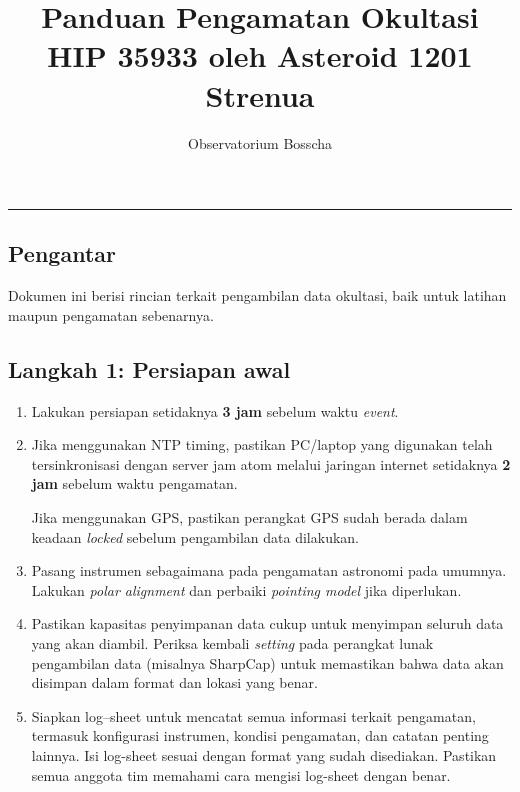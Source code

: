 \documentclass[12pt,a4paper]{article}
\title{\textbf{Panduan Pengamatan Okultasi HIP 35933 oleh Asteroid 1201 Strenua}}
\author{Observatorium Bosscha}
\begin{document}
\maketitle
\noindent\rule{\linewidth}{0.4pt}

\subsection*{Pengantar}
Dokumen ini berisi rincian terkait pengambilan data okultasi, baik untuk latihan maupun pengamatan sebenarnya.
\subsection*{Langkah 1: Persiapan awal}
\begin{enumerate}
	\item Lakukan persiapan setidaknya \textbf{3 jam} sebelum waktu \textit{event}.
	\item Jika menggunakan NTP timing, pastikan PC/laptop yang digunakan telah tersinkronisasi dengan server jam atom melalui jaringan internet setidaknya \textbf{2 jam} sebelum waktu pengamatan.
	
	Jika menggunakan GPS, pastikan perangkat GPS sudah berada dalam keadaan \textit{locked} sebelum pengambilan data dilakukan.
	\item Pasang instrumen sebagaimana pada pengamatan astronomi pada umumnya. Lakukan \textit{polar alignment} dan perbaiki \textit{pointing model} jika diperlukan.
	\item Pastikan kapasitas penyimpanan data cukup untuk menyimpan seluruh data yang akan diambil. Periksa kembali \textit{setting} pada perangkat lunak pengambilan data (misalnya SharpCap) untuk memastikan bahwa data akan disimpan dalam format dan lokasi yang benar.
	\item Siapkan log--sheet untuk mencatat semua informasi terkait pengamatan, termasuk konfigurasi instrumen, kondisi pengamatan, dan catatan penting lainnya. Isi log-sheet sesuai dengan format yang sudah disediakan. Pastikan semua anggota tim memahami cara mengisi log-sheet dengan benar.
\end{enumerate}
\pagebreak
\end{document}
